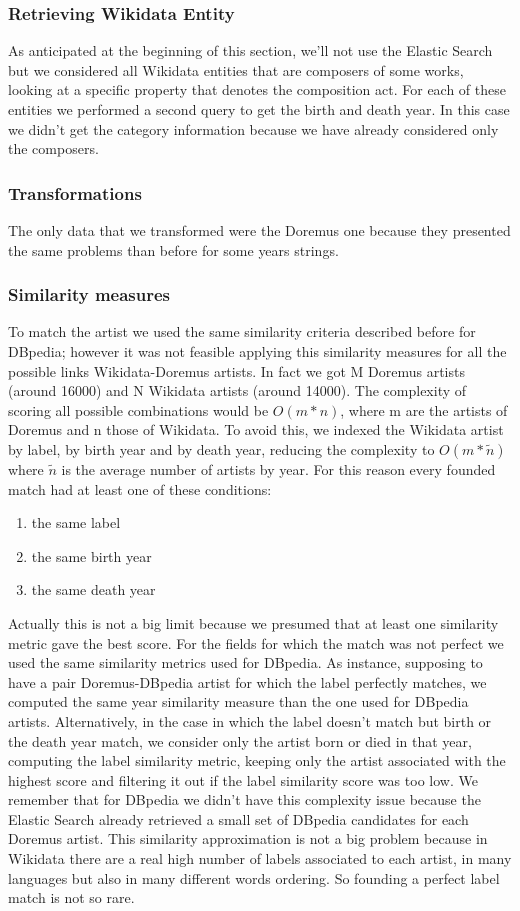 \documentclass[paper=a4, fontsize=11pt]{scrartcl}
\begin{document}
\subsubsection{Retrieving Wikidata Entity}
As anticipated at the beginning of this section, we'll not use the Elastic Search but we considered all Wikidata entities that are composers of some works, looking at a specific property that denotes the composition act. For each of these entities we performed a second query to get the birth and death year. In this case we didn't get the category information because we have already considered only the composers.

\subsubsection{Transformations}
The only data that we transformed were the Doremus one because they presented the same problems than before for some years strings. 

\subsubsection{Similarity measures}
To match the artist we used the same similarity criteria described before for DBpedia; however it was not feasible applying this similarity measures for all the possible links Wikidata-Doremus artists. In fact we got M Doremus artists (around 16000)  and N Wikidata artists (around 14000). The complexity of scoring all possible combinations would be $O(m*n)$, where m are the artists of Doremus and n those of Wikidata. To avoid this, we indexed the Wikidata artist by label, by birth year and by death year, reducing the complexity to $O(m*\tilde{n})$ where $\tilde{n}$ is the average number of artists by year.
For this reason every founded match had at least one of these conditions: 
\begin{enumerate}
\item the same label
\item the same birth year
\item the same death year
\end{enumerate}
Actually this is not a big limit because we presumed that at least one similarity metric gave the best score.
For the fields for which the match was not perfect we used the same similarity metrics used for DBpedia.
As instance, supposing to have a pair Doremus-DBpedia artist for which the label perfectly matches, we computed the same year similarity measure than the one used for DBpedia artists. Alternatively, in the case in which the label doesn't match but birth or the death year match, we consider only the artist born or died in that year, computing the label similarity metric, keeping only the artist associated with the highest score and filtering it out if the label similarity score was too low.
We remember that for DBpedia we didn't have this complexity issue because the Elastic Search already retrieved a small set of DBpedia candidates for each Doremus artist.
This similarity approximation is not a big problem because in Wikidata there are a real high number of labels associated to each artist, in many languages but also in many different words ordering. So founding a perfect label match is not so rare.
\end{document}
